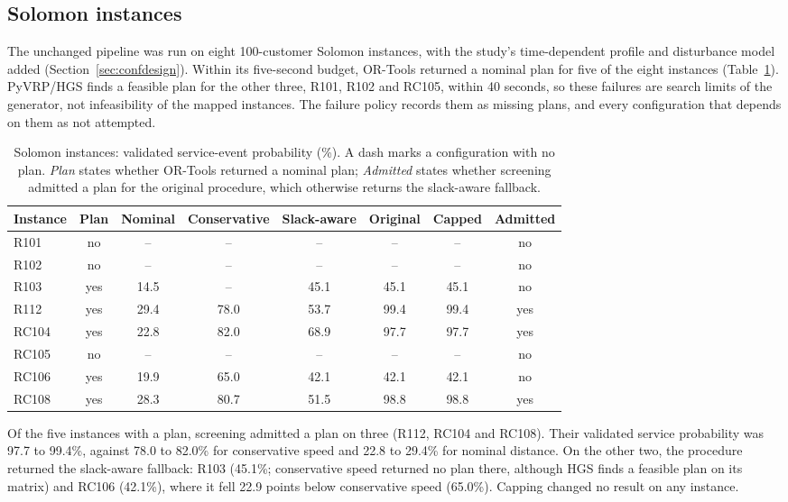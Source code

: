 \subsection{Solomon instances}\label{sec:solomon}

The unchanged pipeline was run on eight 100-customer Solomon instances, with the study's time-dependent profile and disturbance model added (Section~\ref{sec:confdesign}). Within its five-second budget, OR-Tools returned a nominal plan for five of the eight instances (Table~\ref{tab:solomon}). PyVRP/HGS finds a feasible plan for the other three, R101, R102 and RC105, within 40 seconds, so these failures are search limits of the generator, not infeasibility of the mapped instances. The failure policy records them as missing plans, and every configuration that depends on them as not attempted.

\begin{table}[htbp]
\centering
\small
\caption{Solomon instances: validated service-event probability (\%). A dash marks a configuration with no plan. \emph{Plan} states whether OR-Tools returned a nominal plan; \emph{Admitted} states whether screening admitted a plan for the original procedure, which otherwise returns the slack-aware fallback.}
\label{tab:solomon}
\begin{tabular}{@{}lccccccc@{}}
\toprule
Instance & Plan & Nominal & Conservative & Slack-aware & Original & Capped & Admitted\\
\midrule
R101 & no & -- & -- & -- & -- & -- & no\\
R102 & no & -- & -- & -- & -- & -- & no\\
R103 & yes & 14.5 & -- & 45.1 & 45.1 & 45.1 & no\\
R112 & yes & 29.4 & 78.0 & 53.7 & 99.4 & 99.4 & yes\\
RC104 & yes & 22.8 & 82.0 & 68.9 & 97.7 & 97.7 & yes\\
RC105 & no & -- & -- & -- & -- & -- & no\\
RC106 & yes & 19.9 & 65.0 & 42.1 & 42.1 & 42.1 & no\\
RC108 & yes & 28.3 & 80.7 & 51.5 & 98.8 & 98.8 & yes\\
\bottomrule
\end{tabular}
\end{table}

Of the five instances with a plan, screening admitted a plan on three (R112, RC104 and RC108). Their validated service probability was 97.7 to 99.4\%, against 78.0 to 82.0\% for conservative speed and 22.8 to 29.4\% for nominal distance. On the other two, the procedure returned the slack-aware fallback: R103 (45.1\%; conservative speed returned no plan there, although HGS finds a feasible plan on its matrix) and RC106 (42.1\%), where it fell 22.9 points below conservative speed (65.0\%). Capping changed no result on any instance.

